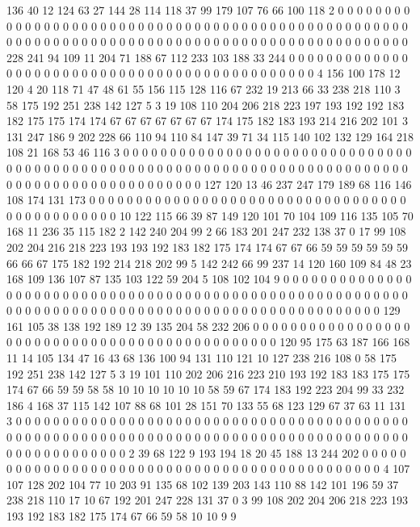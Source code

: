 136 40 12 124 63 27 144 28 114 118 37 99 179 107 76 66 100 118 2 0
0 0 0 0 0 0 0 0 0 0 0 0 0 0 0 0 0 0 0 0
0 0 0 0 0 0 0 0 0 0 0 0 0 0 0 0 0 0 0 0
0 0 0 0 0 0 0 0 0 0 0 0 0 0 0 0 0 0 0 0
0 0 0 0 0 0 0 0 0 0 0 0 0 0 0 0 0 0 0 0
0 0 0 0 0 0 0 0 0 0 0 0 0 228 241 94 109 11 204 71
188 67 112 233 103 188 33 244 0 0 0 0 0 0 0 0 0 0 0 0
0 0 0 0 0 0 0 0 0 0 0 0 0 0 0 0 0 0 0 0
0 0 0 0 0 0 0 0 0 0 0 0 0 0 4 156 100 178 12 120
4 20 118 71 47 48 61 55 156 115 128 116 67 232 19 213 66 33 238 218
110 3 58 175 192 251 238 142 127 5 3 19 108 110 204 206 218 223 197 193
192 192 183 182 175 175 174 174 67 67 67 67 67 67 67 174 175 182 183 193
214 216 202 101 3 131 247 186 9 202 228 66 110 94 110 84 147 39 71 34
115 140 102 132 129 164 218 108 21 168 53 46 116 3 0 0 0 0 0 0
0 0 0 0 0 0 0 0 0 0 0 0 0 0 0 0 0 0 0 0
0 0 0 0 0 0 0 0 0 0 0 0 0 0 0 0 0 0 0 0
0 0 0 0 0 0 0 0 0 0 0 0 0 0 0 0 0 0 0 0
0 0 0 0 0 0 0 0 0 0 0 0 0 0 0 0 0 0 0 0
0 0 0 0 0 0 0 0 0 127 120 13 46 237 247 179 189 68 116 146
108 174 131 173 0 0 0 0 0 0 0 0 0 0 0 0 0 0 0 0
0 0 0 0 0 0 0 0 0 0 0 0 0 0 0 0 0 0 0 0
0 0 0 0 0 0 0 0 0 0 10 122 115 66 39 87 149 120 101 70
104 109 116 135 105 70 168 11 236 35 115 182 2 142 240 204 99 2 66 183
201 247 232 138 37 0 17 99 108 202 204 216 218 223 193 193 192 183 182 175
174 174 67 67 66 59 59 59 59 59 59 66 66 67 175 182 192 214 218 202
99 5 142 242 66 99 237 14 120 160 109 84 48 23 168 109 136 107 87 135
103 122 59 204 5 108 102 104 9 0 0 0 0 0 0 0 0 0 0 0
0 0 0 0 0 0 0 0 0 0 0 0 0 0 0 0 0 0 0 0
0 0 0 0 0 0 0 0 0 0 0 0 0 0 0 0 0 0 0 0
0 0 0 0 0 0 0 0 0 0 0 0 0 0 0 0 0 0 0 0
0 0 0 0 0 0 0 0 0 0 0 0 0 0 0 0 0 0 0 0
0 0 0 0 0 0 129 161 105 38 138 192 189 12 39 135 204 58 232 206
0 0 0 0 0 0 0 0 0 0 0 0 0 0 0 0 0 0 0 0
0 0 0 0 0 0 0 0 0 0 0 0 0 0 0 0 0 0 0 0
0 0 0 0 0 0 120 95 175 63 187 166 168 11 14 105 134 47 16 43
68 136 100 94 131 110 121 10 127 238 216 108 0 58 175 192 251 238 142 127
5 3 19 101 110 202 206 216 223 210 193 192 183 183 175 175 174 67 66 59
59 58 58 10 10 10 10 10 10 58 59 67 174 183 192 223 204 99 33 232
186 4 168 37 115 142 107 88 68 101 28 151 70 133 55 68 123 129 67 37
63 11 131 3 0 0 0 0 0 0 0 0 0 0 0 0 0 0 0 0
0 0 0 0 0 0 0 0 0 0 0 0 0 0 0 0 0 0 0 0
0 0 0 0 0 0 0 0 0 0 0 0 0 0 0 0 0 0 0 0
0 0 0 0 0 0 0 0 0 0 0 0 0 0 0 0 0 0 0 0
0 0 0 0 0 0 0 0 0 0 0 0 0 0 0 0 0 0 0 0
0 0 2 39 68 122 9 193 194 18 20 45 188 13 244 202 0 0 0 0
0 0 0 0 0 0 0 0 0 0 0 0 0 0 0 0 0 0 0 0
0 0 0 0 0 0 0 0 0 0 0 0 0 0 0 0 0 0 0 0
0 4 107 107 128 202 104 77 10 203 91 135 68 102 139 203 143 110 88 142
101 196 59 37 238 218 110 17 10 67 192 201 247 228 131 37 0 3 99 108
202 204 206 218 223 193 193 192 183 182 175 174 67 66 59 58 10 10 9 9

